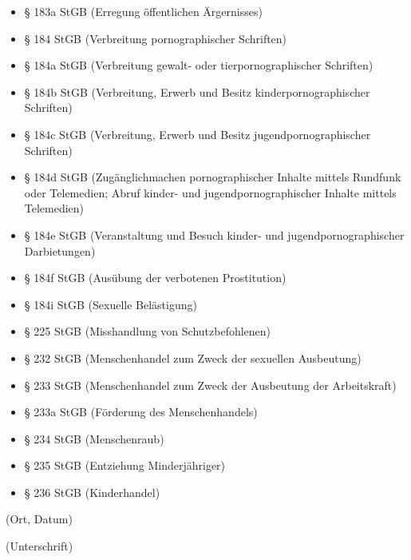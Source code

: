 \documentclass[11pt]{article}
\newcommand{\hint}[1]{{\footnotesize\color{gray}#1}}
\newlength{\tfl}%
\newcommand{\TextFieldFill}[2][]{%
    \setlength{\tfl}{\linewidth}%
    \settowidth{\dimen0}{#2}%
    \addtolength{\tfl}{-\dimen0}%
    \addtolength{\tfl}{-1em}%
    \TextField[#1, bordercolor={}, backgroundcolor={}, width=\tfl]{#2}%
}
\begin{document}
\begin{itemize}[itemsep=-0.1cm]
        \item § 183a StGB (Erregung öffentlichen Ärgernisses)
        \item § 184 StGB (Verbreitung pornographischer Schriften)
        \item § 184a StGB (Verbreitung gewalt- oder tierpornographischer Schriften)
        \item § 184b StGB (Verbreitung, Erwerb und Besitz kinderpornographischer Schriften)
        \item § 184c StGB (Verbreitung, Erwerb und Besitz jugendpornographischer Schriften)
        \item § 184d StGB (Zugänglichmachen pornographischer Inhalte mittels Rundfunk oder Telemedien; Abruf kinder- und jugendpornographischer Inhalte mittels Telemedien)
        \item § 184e StGB (Veranstaltung und Besuch kinder- und jugendpornographischer Darbietungen)
        \item § 184f StGB (Ausübung der verbotenen Prostitution)
        \item § 184i StGB (Sexuelle Belästigung)
        \item § 225 StGB (Misshandlung von Schutzbefohlenen)
        \item § 232 StGB (Menschenhandel zum Zweck der sexuellen Ausbeutung)
        \item § 233 StGB (Menschenhandel zum Zweck der Ausbeutung der Arbeitskraft)
        \item § 233a StGB (Förderung des Menschenhandels)
        \item § 234 StGB (Menschenraub)
        \item § 235 StGB (Entziehung Minderjähriger)
        \item § 236 StGB (Kinderhandel)
    \end{itemize}

    \vspace{1.5cm}

    \begin{minipage}{0.4\textwidth}
        \TextFieldFill[name=dateplace]{}
        \hint{(Ort, Datum)}
    \end{minipage}
    \begin{minipage}{0.6\textwidth}
        \vspace{1.2em}
        \hrulefill

        \hint{(Unterschrift)}
    \end{minipage}
\end{document}
